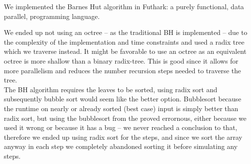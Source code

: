 We implemented the Barnes Hut algorithm in
Futhark\cite{futhark}: a purely functional,
data parallel, programming language.

We ended up not using an octree -- as the traditional BH is implemented -- due
to the complexity of the implementation and time constraints and used a radix
tree which we traverse instead. It might be favorable to use an octree as an
equivalent octree is more shallow than a binary radix-tree. This is good since
it allows for more parallelism and reduces the number recursion steps needed to
traverse the tree.\\

\noindent
The BH algorithm requires the leaves to be sorted, using radix sort and
subsequently bubble sort would seem like the better option. Bubblesort because
the runtime on nearly or already sorted (best case) input is simply better than
radix sort, but using the bubblesort from the
proved errornous, either because we used it wrong or because it has a bug -- we
never reached a conclusion to that, therefore we ended up using radix sort for
the steps, and since we sort the array anyway in each step we completely
abandoned sorting it before simulating any steps.

